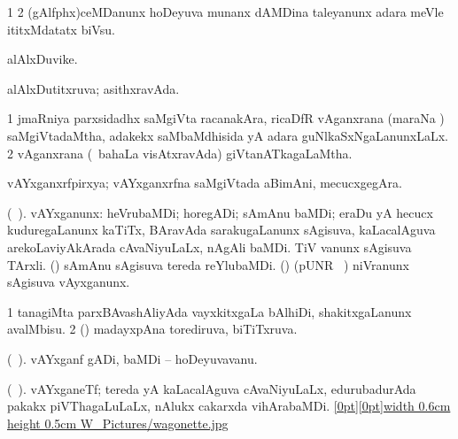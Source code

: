 \bentry
{} 
\gl{\sakirx}
\expl{}
\bmng
\bnum
\num{1}  
\num{2} (gAlfphx)ceMDanunx hoDeyuva munanx dAMDina taleyanunx adara meVle ititxMdatatx biVsu. 
\enum
\emng
\eentry

\bentry
{} 
\gl{\nA}
\expl{}
\bmng
alAlxDuvike. 
\emng
\eentry

\bentry
{} 
\gl{\gu}
\expl{}
\bmng
alAlxDutitxruva; asithxravAda. 
\emng
\eentry

\bentry
{} 
\gl{\gu}
\expl{}
\bmng
\bnum
\num{1} jmaRniya parxsidadhx saMgiVta racanakAra, ricaDfR vAganxrana (maraNa ) saMgiVtadaMtha, adakekx saMbaMdhisida yA adara guNlkaSxNgaLanunxLaLx. 
\num{2} vAganxrana (\kanmu\ bahaLa visAtxravAda) giVtanATkagaLaMtha. 
\enum
\emng
\eentry

\bentry
{} 
\gl{\nA}
\expl{}
\bmng
vAYxganxrfpirxya; vAYxganxrfna saMgiVtada aBimAni, mecucxgegAra. 
\emng
\eentry

\bentry
{}
  \gl{\nA}
\bmng
(\birx\ ). vAYxganunx: 
\banum
{} heVrubaMDi; horegADi; sAmAnu baMDi; eraDu yA hecucx kuduregaLanunx kaTiTx, BAravAda sarakugaLanunx sAgisuva, kaLacalAguva arekoLaviyAkArada cAvaNiyuLaLx, nAgAli baMDi. 
 TiV \mo vanunx sAgisuva TArxli. 
 (\birx) sAmAnu sAgisuva tereda reYlubaMDi. 
 (\AmA)  
 (pUNR \parx\ ) niVranunx sAgisuva vAyxganunx. 
\eanum
\emng

\noindent 
\gl{\pagu}
\expl{}
\bmng
\hypertarget{wagon(1)}{} 
\bnum
\num{1}  tanagiMta parxBAvashAliyAda vayxkitxgaLa bAlhiDi, shakitxgaLanunx avalMbisu. 
\num{2}  (\ashi) madayxpAna torediruva, biTiTxruva. 
\enum
\emng
\eentry

\bentry
{} 
\gl{\nA}
\bmng
(\birx\ ). vAYxganf gADi, baMDi -- hoDeyuvavanu. 
\emng
\eentry

{} 
\gl{\nA}
\expl{}
\bmng
(\birx\ ). vAYxganeTf; tereda yA kaLacalAguva cAvaNiyuLaLx, edurubadurAda pakakx piVThagaLuLaLx, nAlukx cakarxda vihArabaMDi. \quad \hyperlink{wagonettefigure}{\raisebox{-0.15cm}[0pt][0pt]{\pdfimage width 0.6cm height 0.5cm {W_Pictures/wagonette.jpg}}} 
\emng
\eentry


